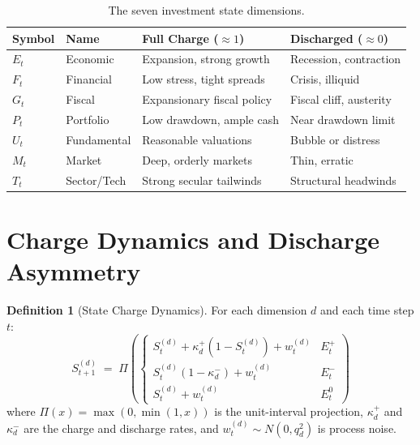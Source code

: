 \documentclass[12pt,openany]{book}
\newcommand{\calE}{\mathcal{E}}
\newcommand{\calF}{\mathcal{F}}
\newcommand{\calG}{\mathcal{G}}
\newcommand{\calP}{\mathcal{P}}
\newcommand{\calU}{\mathcal{U}}
\newcommand{\calM}{\mathcal{M}}
\newcommand{\calT}{\mathcal{T}}
\numberwithin{equation}{chapter}
\theoremstyle{plain}
\theoremstyle{definition}
\newtheorem{definition}[theorem]{Definition}
\theoremstyle{remark}
\def\mathcal#1{#1}%
\def\calE{E}%
\def\calF{F}%
\def\calG{G}%
\def\calP{P}%
\def\calU{U}%
\def\calM{M}%
\def\calT{T}%
\begin{document}
\begin{table}[H]
\centering
\caption{The seven investment state dimensions.}
\label{tab:seven-states}
\small
\begin{tabularx}{\textwidth}{@{} l l X X @{}}
\toprule
\textbf{Symbol} & \textbf{Name} & \textbf{Full Charge ($\approx 1$)}
  & \textbf{Discharged ($\approx 0$)} \\
\midrule
$\calE_t$ & Economic    & Expansion, strong growth & Recession, contraction \\
$\calF_t$ & Financial   & Low stress, tight spreads & Crisis, illiquid \\
$\calG_t$ & Fiscal      & Expansionary fiscal policy & Fiscal cliff, austerity \\
$\calP_t$ & Portfolio   & Low drawdown, ample cash & Near drawdown limit \\
$\calU_t$ & Fundamental & Reasonable valuations & Bubble or distress \\
$\calM_t$ & Market      & Deep, orderly markets & Thin, erratic \\
$\calT_t$ & Sector/Tech & Strong secular tailwinds & Structural headwinds \\
\bottomrule
\end{tabularx}
\end{table}

\section{Charge Dynamics and Discharge Asymmetry}

\begin{definition}[State Charge Dynamics]
\label{def:charge-dynamics}
For each dimension $d$ and each time step $t$:
\begin{equation}
  \mathcal{S}_{t+1}^{(d)} \;=\; \Pi\!\left(
  \begin{cases}
    \mathcal{S}_t^{(d)} + \kappa_d^{+}(1 - \mathcal{S}_t^{(d)})
      + w_t^{(d)} & E_t^{+} \\
    \mathcal{S}_t^{(d)}(1 - \kappa_d^{-}) + w_t^{(d)} & E_t^{-} \\
    \mathcal{S}_t^{(d)} + w_t^{(d)} & E_t^{0}
  \end{cases}
  \right)
  \label{eq:charge-dynamics}
\end{equation}
where $\Pi(x) = \max(0,\min(1,x))$ is the unit-interval
projection, $\kappa_d^{+}$ and $\kappa_d^{-}$ are the charge and
discharge rates, and $w_t^{(d)} \sim \mathcal{N}(0,q_d^2)$ is
process noise.
\end{definition}
\end{document}
